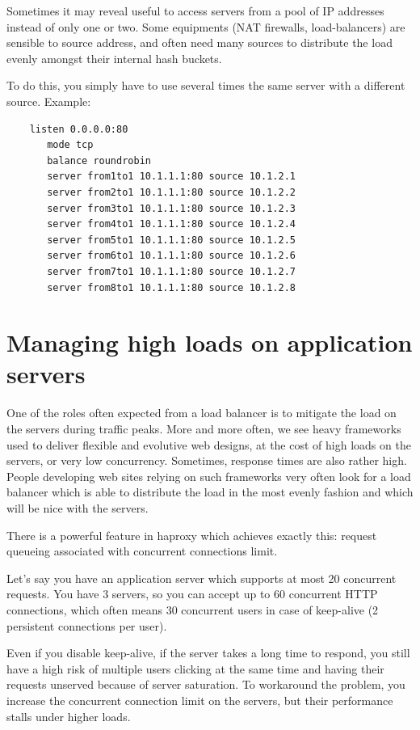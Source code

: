 Sometimes it may reveal useful to access servers from a pool of IP addresses
instead of only one or two. Some equipments (NAT firewalls, load-balancers)
are sensible to source address, and often need many sources to distribute the
load evenly amongst their internal hash buckets.

To do this, you simply have to use several times the same server with a
different source. Example:

\begin{verbatim}
    listen 0.0.0.0:80
       mode tcp
       balance roundrobin
       server from1to1 10.1.1.1:80 source 10.1.2.1
       server from2to1 10.1.1.1:80 source 10.1.2.2
       server from3to1 10.1.1.1:80 source 10.1.2.3
       server from4to1 10.1.1.1:80 source 10.1.2.4
       server from5to1 10.1.1.1:80 source 10.1.2.5
       server from6to1 10.1.1.1:80 source 10.1.2.6
       server from7to1 10.1.1.1:80 source 10.1.2.7
       server from8to1 10.1.1.1:80 source 10.1.2.8
\end{verbatim}

\section{Managing high loads on application servers}
\label{sec:managing_high_loads_on_application_servers}

One of the roles often expected from a load balancer is to mitigate the load on
the servers during traffic peaks. More and more often, we see heavy frameworks
used to deliver flexible and evolutive web designs, at the cost of high loads
on the servers, or very low concurrency. Sometimes, response times are also
rather high. People developing web sites relying on such frameworks very often
look for a load balancer which is able to distribute the load in the most
evenly fashion and which will be nice with the servers.

There is a powerful feature in haproxy which achieves exactly this: request
queueing associated with concurrent connections limit.

Let's say you have an application server which supports at most 20 concurrent
requests. You have 3 servers, so you can accept up to 60 concurrent HTTP
connections, which often means 30 concurrent users in case of keep-alive (2
persistent connections per user).

Even if you disable keep-alive, if the server takes a long time to respond,
you still have a high risk of multiple users clicking at the same time and
having their requests unserved because of server saturation. To workaround
the problem, you increase the concurrent connection limit on the servers,
but their performance stalls under higher loads.

